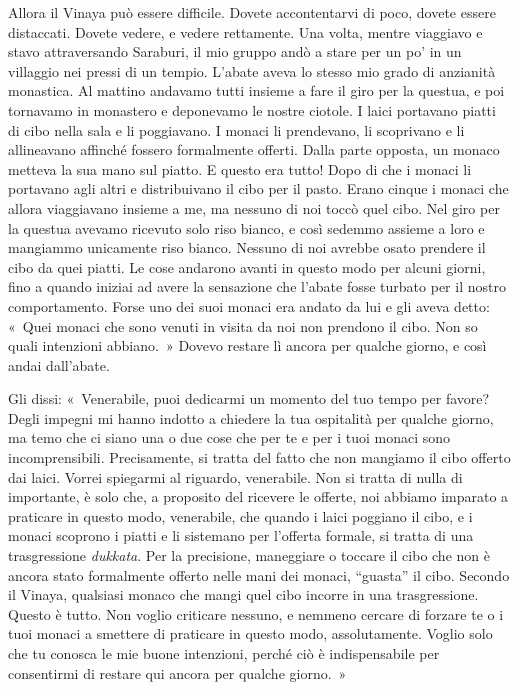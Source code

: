Allora il Vinaya può essere difficile. Dovete accontentarvi di poco,
dovete essere distaccati. Dovete vedere, e vedere rettamente. Una volta,
mentre viaggiavo e stavo attraversando Saraburi, il mio gruppo andò a
stare per un po' in un villaggio nei pressi di un tempio. L'abate aveva
lo stesso mio grado di anzianità monastica. Al mattino andavamo tutti
insieme a fare il giro per la questua, e poi tornavamo in monastero e
deponevamo le nostre ciotole. I laici portavano piatti di cibo nella
sala e li poggiavano. I monaci li prendevano, li scoprivano e li
allineavano affinché fossero formalmente offerti. Dalla parte opposta,
un monaco metteva la sua mano sul piatto. E questo era tutto! Dopo di
che i monaci li portavano agli altri e distribuivano il cibo per il
pasto. Erano cinque i monaci che allora viaggiavano insieme a me, ma
nessuno di noi toccò quel cibo. Nel giro per la questua avevamo ricevuto
solo riso bianco, e così sedemmo assieme a loro e mangiammo unicamente
riso bianco. Nessuno di noi avrebbe osato prendere il cibo da quei
piatti. Le cose andarono avanti in questo modo per alcuni giorni, fino a
quando iniziai ad avere la sensazione che l'abate fosse turbato per il
nostro comportamento. Forse uno dei suoi monaci era andato da lui e gli
aveva detto: «~Quei monaci che sono venuti in visita da noi non prendono
il cibo. Non so quali intenzioni abbiano.~» Dovevo restare lì ancora per
qualche giorno, e così andai dall'abate.

Gli dissi: «~Venerabile, puoi dedicarmi un momento del tuo tempo per
favore? Degli impegni mi hanno indotto a chiedere la tua ospitalità per
qualche giorno, ma temo che ci siano una o due cose che per te e per i
tuoi monaci sono incomprensibili. Precisamente, si tratta del fatto che
non mangiamo il cibo offerto dai laici. Vorrei spiegarmi al riguardo,
venerabile. Non si tratta di nulla di importante, è solo che, a
proposito del ricevere le offerte, noi abbiamo imparato a praticare in
questo modo, venerabile, che quando i laici poggiano il cibo, e i monaci
scoprono i piatti e li sistemano per l'offerta formale, si tratta di una
trasgressione \emph{dukkata}. Per la precisione, maneggiare o toccare il
cibo che non è ancora stato formalmente offerto nelle mani dei monaci,
``guasta'' il cibo. Secondo il Vinaya, qualsiasi monaco che mangi quel
cibo incorre in una trasgressione. Questo è tutto. Non voglio criticare
nessuno, e nemmeno cercare di forzare te o i tuoi monaci a smettere di
praticare in questo modo, assolutamente. Voglio solo che tu conosca le
mie buone intenzioni, perché ciò è indispensabile per consentirmi di
restare qui ancora per qualche giorno.~»

